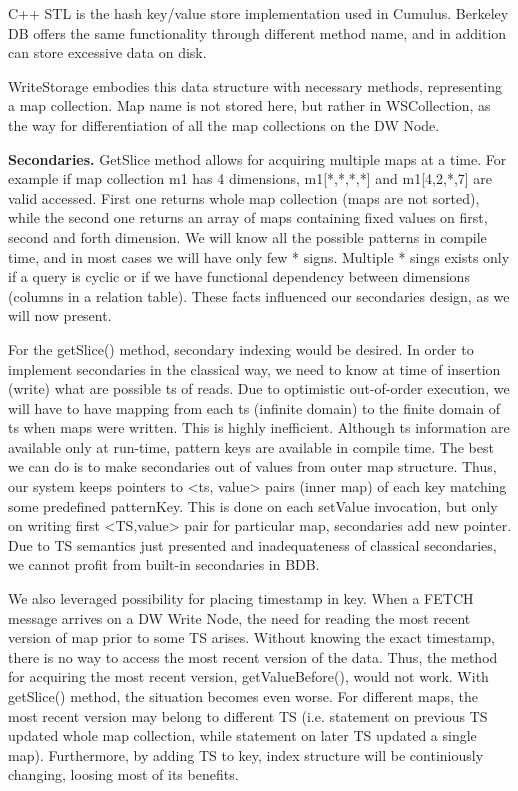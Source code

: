 \documentclass{sig-semester}
\begin{document}
C++ STL is the hash key/value store implementation used in Cumulus. Berkeley DB offers the same functionality through different method name, and in addition can store excessive data on disk.

WriteStorage embodies this data structure with necessary methods, representing a map collection. Map name is not stored here, but rather in WSCollection, as the way for differentiation of all the map collections on the DW Node.

\textbf{Secondaries.} GetSlice method allows for acquiring multiple maps at a time. For example if map collection m1 has 4 dimensions, m1[*,*,*,*] and m1[4,2,*,7] are valid accessed. First one returns whole map collection (maps are not sorted), while the second one returns an array of maps containing fixed values on first, second and forth dimension. We will know all the possible patterns in compile time, and in most cases we will have only few * signs. Multiple * sings exists only if a query is cyclic or if we have functional dependency between dimensions (columns in a relation table). These facts influenced our secondaries design, as we will now present.

For the getSlice() method, secondary indexing would be desired. In order to implement secondaries in the classical way, we need to know at time of insertion (write) what are possible ts of reads. Due to optimistic out-of-order execution, we will have to have mapping from each ts (infinite domain) to the finite domain of ts when maps were written. This is highly inefficient. Although ts information are available only at run-time, pattern keys are available in compile time. The best we can do is to make secondaries out of values from outer map structure. Thus, our system keeps pointers to <ts, value> pairs (inner map) of each key matching some predefined patternKey. This is done on each setValue invocation, but only on writing first <TS,value> pair for particular map, secondaries add new pointer. Due to TS semantics just presented and inadequateness of classical secondaries, we cannot profit from built-in secondaries in BDB.

We also leveraged possibility for placing timestamp in key. When a FETCH message arrives on a DW Write Node, the need for reading the most recent version of map prior to some TS arises. Without knowing the exact timestamp, there is no way to access the most recent version of the data. Thus, the method for acquiring the most recent version, getValueBefore(), would not work. With getSlice() method, the situation becomes even worse. For different maps, the most recent version may belong to different TS (i.e. statement on previous TS updated whole map collection, while statement on later TS updated a single map). Furthermore, by adding TS to key, index structure will be continiously changing, loosing most of its benefits.
\end{document}
